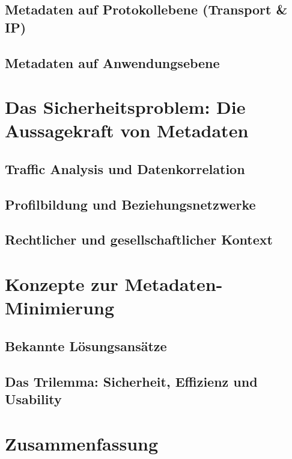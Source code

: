 \subsection{Metadaten auf Protokollebene (Transport \& IP)}

\subsection{Metadaten auf Anwendungsebene}

\section{Das Sicherheitsproblem: Die Aussagekraft von Metadaten}

\subsection{Traffic Analysis und Datenkorrelation}

\subsection{Profilbildung und Beziehungsnetzwerke}

\subsection{Rechtlicher und gesellschaftlicher Kontext}

\section{Konzepte zur Metadaten-Minimierung}

\subsection{Bekannte Lösungsansätze}

\subsection{Das Trilemma: Sicherheit, Effizienz und Usability}

\section{Zusammenfassung}